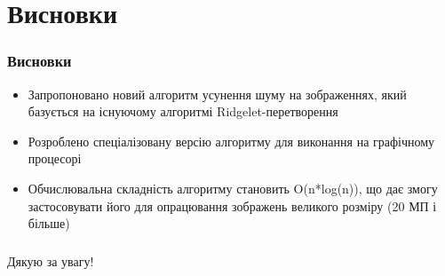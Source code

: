 \documentclass[12pt]{beamer}
\begin{document}
\section{Висновки}
\begin{frame}\frametitle{Висновки }
 \begin{itemize}		
 	\item Запропоновано новий алгоритм усунення шуму на зображеннях, який базується на існуючому алгоритмі Ridgelet-перетворення
 	\item Розроблено спеціалізовану версію алгоритму для виконання на графічному процесорі
 	\item Обчислювальна складність алгоритму становить O(n*log(n)), що дає змогу застосовувати його для опрацювання зображень великого розміру (20 МП і більше)
 \end{itemize}
\end{frame}

\begin{frame}\frametitle{}
	\begin{center}
	{\Large Дякую за увагу!}
	\end{center}
\end{frame}
\end{document}
